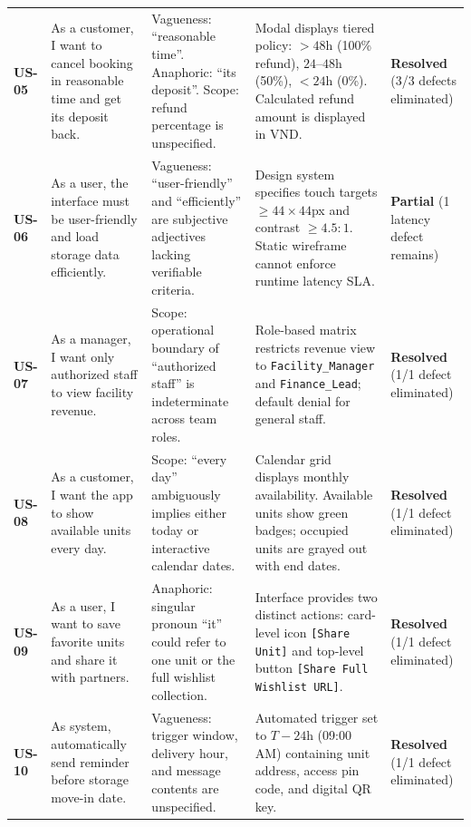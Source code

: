 \documentclass[11pt,a4paper]{article}
\begin{document}
\begin{table}[htbp]
\begin{tabularx}{\textwidth}{p{} p{} p{} p{} p{}}
\addlinespace
\textbf{US-05} & As a customer, I want to cancel booking in reasonable time and get its deposit back. & Vagueness: ``reasonable time''. Anaphoric: ``its deposit''. Scope: refund percentage is unspecified. & Modal displays tiered policy: $>48$h (100\% refund), $24$--$48$h (50\%), $<24$h (0\%). Calculated refund amount is displayed in VND. & \textbf{Resolved} (3/3 defects eliminated) \\
\addlinespace
\textbf{US-06} & As a user, the interface must be user-friendly and load storage data efficiently. & Vagueness: ``user-friendly'' and ``efficiently'' are subjective adjectives lacking verifiable criteria. & Design system specifies touch targets $\ge 44 \times 44$px and contrast $\ge 4.5:1$. Static wireframe cannot enforce runtime latency SLA. & \textbf{Partial} (1 latency defect remains) \\
\addlinespace
\textbf{US-07} & As a manager, I want only authorized staff to view facility revenue. & Scope: operational boundary of ``authorized staff'' is indeterminate across team roles. & Role-based matrix restricts revenue view to \texttt{Facility\_Manager} and \texttt{Finance\_Lead}; default denial for general staff. & \textbf{Resolved} (1/1 defect eliminated) \\
\addlinespace
\textbf{US-08} & As a customer, I want the app to show available units every day. & Scope: ``every day'' ambiguously implies either today or interactive calendar dates. & Calendar grid displays monthly availability. Available units show green badges; occupied units are grayed out with end dates. & \textbf{Resolved} (1/1 defect eliminated) \\
\addlinespace
\textbf{US-09} & As a user, I want to save favorite units and share it with partners. & Anaphoric: singular pronoun ``it'' could refer to one unit or the full wishlist collection. & Interface provides two distinct actions: card-level icon \texttt{[Share Unit]} and top-level button \texttt{[Share Full Wishlist URL]}. & \textbf{Resolved} (1/1 defect eliminated) \\
\addlinespace
\textbf{US-10} & As system, automatically send reminder before storage move-in date. & Vagueness: trigger window, delivery hour, and message contents are unspecified. & Automated trigger set to $T-24$h (09:00 AM) containing unit address, access pin code, and digital QR key. & \textbf{Resolved} (1/1 defect eliminated) \\
\bottomrule
\end{tabularx}
\end{table}
\end{document}
